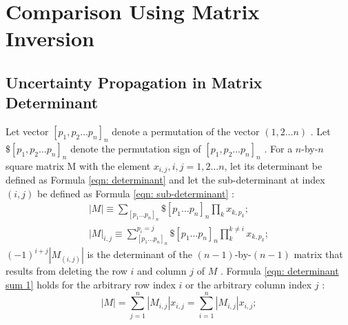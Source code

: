 \documentclass[twoside]{article}
\numberwithin{equation}{section}
\begin{document}
\clearpage
\section{Comparison Using Matrix Inversion}
\label{sec: matrix}


\subsection{Uncertainty Propagation in Matrix Determinant}

Let vector $[p_{1}, p_{2} \dots p_{n}]_{n}$ denote a permutation of the vector $(1,2\dots n)$ \cite{Linear_Algebra}.  Let $\$[p_{1}, p_{2} \dots p_{n}]_{n}$ denote the permutation sign of $[p_{1}, p_{2} \dots p_{n}]_{n}$ \cite{Linear_Algebra}.  For a $n$-by-$n$ square matrix M with the element $x_{i,j}, i,j=1,2\dots n$, let its determinant be defined as Formula \eqref{eqn: determinant} \cite{Numerical_Recipes} and let the sub-determinant at index $(i, j)$ be defined as Formula \eqref{eqn: sub-determinant} \cite{Linear_Algebra}:
\begin{align}
\label{eqn: determinant}
|M| \equiv 
\sum_{[p_{1}\dots p_{n}]_{n}} \$ [p_{1}\dots p_{n}]_{n} 
    \prod _{k} x_{k,p_{k}}; \\
\label{eqn: sub-determinant}
|M|_{i,j} \equiv 
\sum_{[p_{1}\dots p_{n}]_{n}}^{p_{i} = j} \$ [p_{1}\dots p_{n}]_{n} 
    \prod _{k}^{k \ne i} x_{k,p_{k}};
\end{align}
$(-1)^{i+j} |M_{(i,j)}|$ is the determinant of the $(n-1)$-by-$(n-1)$ matrix that results from deleting the row $i$ and column $j$ of $M$ \cite{Numerical_Recipes}.  Formula \eqref{eqn: determinant sum 1} holds for the arbitrary row index $i$ or the arbitrary column index $j$ \cite{Numerical_Recipes}:
\begin{equation}
\label{eqn: determinant sum 1}
|M| =\sum_{j=1}^{n} |M_{i,j}| x_{i,j} = \sum_{i=1}^{n} |M_{i,j}| x_{i,j};
\end{equation}
\end{document}
